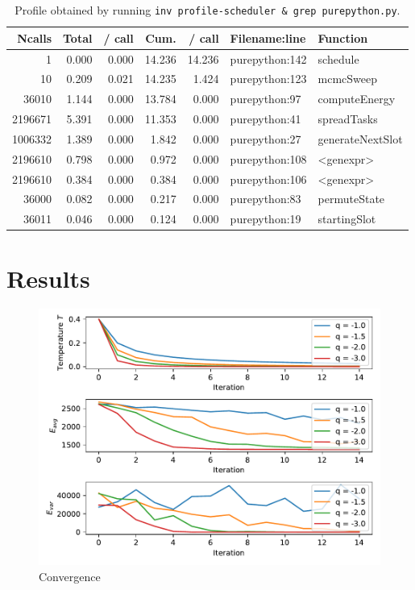\documentclass{prettytex/ox/mmsc-special-topic}
\begin{document}
  \begin{table}[H]
    \centering
    \caption{Profile obtained by running \texttt{inv profile-scheduler & grep purepython.py}.}
    \begin{tabular}{rrrrrll}
      \hline
      \bf Ncalls & \bf Total & \bf / call & \bf Cum. & \bf / call & \bf Filename:line & \bf Function     \\
      \hline
      1          & 0.000     & 0.000      & 14.236   & 14.236     & purepython:142    & schedule         \\
      10         & 0.209     & 0.021      & 14.235   & 1.424      & purepython:123    & mcmcSweep        \\
      36010      & 1.144     & 0.000      & 13.784   & 0.000      & purepython:97     & computeEnergy    \\
      2196671    & 5.391     & 0.000      & 11.353   & 0.000      & purepython:41     & spreadTasks      \\
      1006332    & 1.389     & 0.000      & 1.842    & 0.000      & purepython:27     & generateNextSlot \\
      2196610    & 0.798     & 0.000      & 0.972    & 0.000      & purepython:108    & <genexpr>        \\
      2196610    & 0.384     & 0.000      & 0.384    & 0.000      & purepython:106    & <genexpr>        \\
      36000      & 0.082     & 0.000      & 0.217    & 0.000      & purepython:83     & permuteState     \\
      36011      & 0.046     & 0.000      & 0.124    & 0.000      & purepython:19     & startingSlot     \\
    \end{tabular}
  \end{table}

  \section{Results}
  \begin{figure}[H]
    \centering
    \includegraphics[width=0.8\linewidth]{results/convergence.pdf}
    \caption{Convergence}
  \end{figure}
\end{document}
